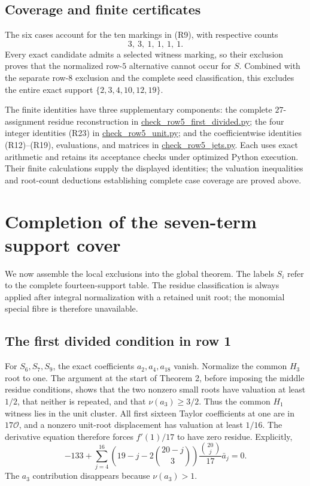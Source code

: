 \documentclass[
  british,
  10pt,
  a4paper,
]{article}
\begin{document}
\subsection{Coverage and finite
certificates}\label{coverage-and-finite-certificates}

The six cases account for the ten markings in (R9), with respective
counts \[
3,\ 3,\ 1,\ 1,\ 1,\ 1.
\] Every exact candidate admits a selected witness marking, so their
exclusion proves that the normalized row-\(5\) alternative cannot occur
for \(S\). Combined with the separate row-\(8\) exclusion and the
complete seed classification, this excludes the entire exact support
\(\{2,3,4,10,12,19\}\).

The finite identities have three supplementary components: the complete
\(27\)-assignment residue reconstruction in
\href{research/next-stage/check_row5_first_divided.py}{check\_row5\_first\_divided.py};
the four integer identities (R23) in
\href{research/next-stage/row5-unit/check_row5_unit.py}{check\_row5\_unit.py};
and the coefficientwise identities (R12)--(R19), evaluations, and
matrices in
\href{research/next-stage/row5-jets/check_row5_jets.py}{check\_row5\_jets.py}.
Each uses exact arithmetic and retains its acceptance checks under
optimized Python execution. Their finite calculations supply the
displayed identities; the valuation inequalities and root-count
deductions establishing complete case coverage are proved above.

\section{Completion of the seven-term support
cover}\label{completion-of-the-seven-term-support-cover}

We now assemble the local exclusions into the global theorem. The labels
\(S_i\) refer to the complete fourteen-support table. The residue
classification is always applied after integral normalization with a
retained unit root; the monomial special fibre is therefore unavailable.

\subsection{The first divided condition in row
1}\label{the-first-divided-condition-in-row-1}

For \(S_6,S_7,S_9\), the exact coefficients \(a_2,a_4,a_{18}\) vanish.
Normalize the common \(H_3\) root to one. The argument at the start of
Theorem 2, before imposing the middle residue conditions, shows that the
two nonzero small roots have valuation at least \(1/2\), that neither is
repeated, and that \(\nu(a_3)\ge3/2\). Thus the common \(H_1\) witness
lies in the unit cluster. All first sixteen Taylor coefficients at one
are in \(17\mathcal O\), and a nonzero unit-root displacement has
valuation at least \(1/16\). The derivative equation therefore forces
\(f'(1)/17\) to have zero residue. Explicitly, \[
-133+\sum_{j=4}^{16}
 \left(19-j-2\binom{20-j}{3}\right)
 \frac{\binom{20}{j}}{17}\bar a_j=0.
\] The \(a_3\) contribution disappears because \(\nu(a_3)>1\).
\end{document}
